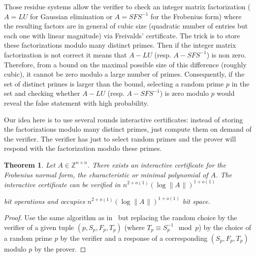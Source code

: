 \documentclass{article}
\newtheorem{theorem}{Theorem}
\newcommand{\Z}{\ensuremath{\mathbb Z}}\newcommand{\ZZ}{\Z}
\newcommand{\lognormA}{\log\| A\mspace{1mu} \|}
\begin{document}
Those residue systems allow the verifier to check an integer matrix
factorization 
($A=LU$ for Gaussian elimination or $A=SFS^{-1}$ for the Frobenius form) where
the resulting factors are in general of cubic size (quadratic number of entries
but each one with linear magnitude) via Freivalds' certificate.
The trick is to store these factorizations modulo many distinct primes.
Then if the integer matrix factorization is not correct it means that $A-LU$
(resp. $A-SFS^{-1}$) is non zero. 
Therefore, from a bound on the maximal possible size of this difference (roughly
cubic), it cannot be zero modulo a large number of primes. 
Consequently, if the set
of distinct primes is larger than the bound, selecting a random prime $p$ in the
set and checking whether $A-LU$ (resp. $A-SFS^{-1}$) is zero modulo $p$ would
reveal the false statement with high probability.

Our idea here is to use several rounds interactive certificates: instead of
storing the factorizations modulo many distinct primes, just compute them on
demand of the verifier. The verifier has just to select random primes and the
prover will respond with the factorization modulo these primes.

\begin{theorem}\label{thm:RNS}
  Let $A\in \Z^{n\times n}$. There exists an {\em interactive certificate} for the
  Frobenius normal form, the characteristic or minimal polynomial of $A$. The
  interactive certificate can be verified in $n^{2+o(1)}(\lognormA)^{1+o(1)}$
 
  bit operations
  and occupies $n^{2+o(1)}(\lognormA)^{1+o(1)}$ bit space.
\end{theorem}
\begin{proof}
  Use the same algorithm as in~\cite[Theorem 4]{Kaltofen:2011:quadcert} but
  replacing the random choice by the verifier of a given tuple $(p,S_p,F_p,T_p)$
  (where $T_p\equiv S_p^{-1} \mod p$) by the choice of a random prime $p$ by the
  verifier  and a response of a corresponding $(S_p,F_p,T_p)$ modulo $p$ by the
  prover. 
\end{proof}
\end{document}
